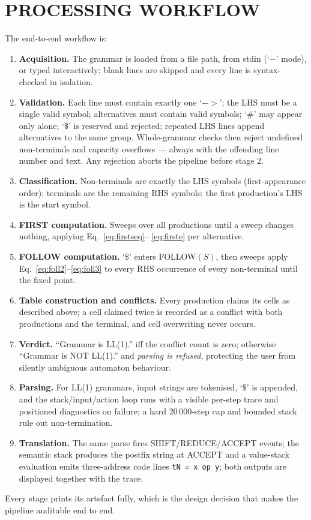 \documentclass[12pt,a4paper,oneside,openany]{report}
\newcommand{\code}[1]{\texttt{#1}}
\begin{document}
\section{PROCESSING WORKFLOW}
The end-to-end workflow is:
\begin{enumerate}
  \item \textbf{Acquisition.} The grammar is loaded from a file path, from
        stdin (`$-$' mode), or typed interactively; blank lines are
        skipped and every line is syntax-checked in isolation.
  \item \textbf{Validation.} Each line must contain exactly one `$->$';
        the LHS must be a single valid symbol; alternatives must contain
        valid symbols; `$\#$' may appear only alone; `$\$$' is reserved
        and rejected; repeated LHS lines append alternatives to the same
        group. Whole-grammar checks then reject undefined non-terminals
        and capacity overflows --- always with the offending line number
        and text. Any rejection aborts the pipeline before stage 2.
  \item \textbf{Classification.} Non-terminals are exactly the LHS
        symbols (first-appearance order); terminals are the remaining RHS
        symbols; the first production's LHS is the start symbol.
  \item \textbf{FIRST computation.} Sweeps over all productions until a
        sweep changes nothing, applying Eq.~\eqref{eq:firstseq}--%
        \eqref{eq:firste} per alternative.
  \item \textbf{FOLLOW computation.} `$\$$' enters FOLLOW$(S)$, then
        sweeps apply Eq.~\eqref{eq:foll2}--\eqref{eq:foll3} to every RHS
        occurrence of every non-terminal until the fixed point.
  \item \textbf{Table construction and conflicts.} Every production
        claims its cells as described above; a cell claimed twice is
        recorded as a conflict with both productions and the terminal,
        and cell overwriting never occurs.
  \item \textbf{Verdict.} ``Grammar is LL(1).'' iff the conflict count is
        zero; otherwise ``Grammar is NOT LL(1).'' and \emph{parsing is
        refused}, protecting the user from silently ambiguous automaton
        behaviour.
  \item \textbf{Parsing.} For LL(1) grammars, input strings are
        tokenised, `$\$$' is appended, and the stack/input/action loop
        runs with a visible per-step trace and positioned diagnostics on
        failure; a hard 20\,000-step cap and bounded stack rule out
        non-termination.
  \item \textbf{Translation.} The same parse fires SHIFT/REDUCE/ACCEPT
        events; the semantic stack produces the postfix string at ACCEPT
        and a value-stack evaluation emits three-address code lines
        \code{tN = x op y}; both outputs are displayed together with the
        trace.
\end{enumerate}
Every stage prints its artefact fully, which is the design decision that
makes the pipeline auditable end to end.
\end{document}
